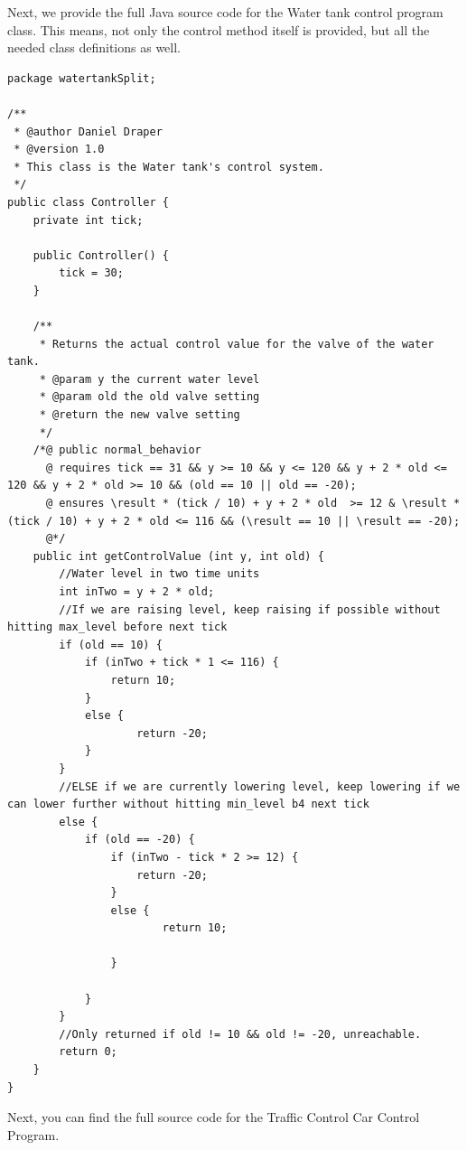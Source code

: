 Next, we provide the full Java source code for the Water tank control program class. This means, not only the control method itself is provided, but all the needed class definitions as well.

\begin{lstlisting}[label=app:lst:watertankContr]
package watertankSplit;

/**
 * @author Daniel Draper
 * @version 1.0
 * This class is the Water tank's control system.
 */
public class Controller {
	private int tick;
	
	public Controller() {
		tick = 30;
	}
	
	/**
	 * Returns the actual control value for the valve of the water tank.
	 * @param y the current water level
	 * @param old the old valve setting
	 * @return the new valve setting
	 */
	/*@ public normal_behavior
	  @ requires tick == 31 && y >= 10 && y <= 120 && y + 2 * old <= 120 && y + 2 * old >= 10 && (old == 10 || old == -20);
	  @ ensures \result * (tick / 10) + y + 2 * old  >= 12 & \result * (tick / 10) + y + 2 * old <= 116 && (\result == 10 || \result == -20);
	  @*/
	public int getControlValue (int y, int old) {
		//Water level in two time units
		int inTwo = y + 2 * old;
		//If we are raising level, keep raising if possible without hitting max_level before next tick
		if (old == 10) {
			if (inTwo + tick * 1 <= 116) {
				return 10;
			}
			else {
					return -20;
			}
		}
		//ELSE if we are currently lowering level, keep lowering if we can lower further without hitting min_level b4 next tick
		else {
			if (old == -20) {
				if (inTwo - tick * 2 >= 12) {
					return -20;
				}
				else {
						return 10;
				
				}
		
			}
		}
		//Only returned if old != 10 && old != -20, unreachable.
		return 0;
	}
}
\end{lstlisting}

Next, you can find the full source code for the Traffic Control Car Control Program. 

